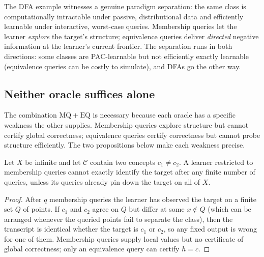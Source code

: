\begin{remark}
\label{rmk:queries-paradigm}
The DFA example witnesses a genuine paradigm separation: the same class is computationally intractable under passive, distributional data and efficiently learnable under interactive, worst-case queries. Membership queries let the learner \emph{explore} the target's structure; equivalence queries deliver \emph{directed} negative information at the learner's current frontier. The separation runs in both directions: some classes are PAC-learnable but not efficiently exactly learnable (equivalence queries can be costly to simulate), and DFAs go the other way.
\end{remark}

\subsection{Neither oracle suffices alone}

The combination $\mathrm{MQ} + \mathrm{EQ}$ is necessary because each oracle has a specific weakness the other supplies. Membership queries explore structure but cannot certify global correctness; equivalence queries certify correctness but cannot probe structure efficiently. The two propositions below make each weakness precise.

\begin{prop}
\label{prop:mq-alone}
Let $X$ be infinite and let $\mathcal{C}$ contain two concepts $c_1 \neq c_2$. A learner restricted to membership queries cannot exactly identify the target after any finite number of queries, unless its queries already pin down the target on all of $X$.
\end{prop}

\begin{proof}
After $q$ membership queries the learner has observed the target on a finite set $Q$ of points. If $c_1$ and $c_2$ agree on $Q$ but differ at some $x \notin Q$ (which can be arranged whenever the queried points fail to separate the class), then the transcript is identical whether the target is $c_1$ or $c_2$, so any fixed output is wrong for one of them. Membership queries supply local values but no certificate of global correctness; only an equivalence query can certify $h = c$.
\end{proof}

